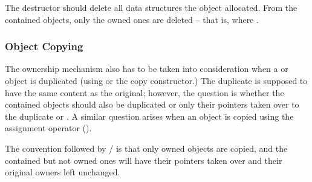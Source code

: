 The destructor should delete all data structures the object allocated.
From the contained objects, only the owned ones are deleted -- that is,
where .


\subsubsection{Object Copying}
\label{sec:sim-lib:ownership-and-object-copying}

The ownership mechanism also has to be taken into consideration
when a  or  object is duplicated
(using  or the copy constructor.)
The duplicate is supposed to have the same content as the
original; however, the question is whether the contained objects
should also be duplicated or only their pointers taken over
to the duplicate  or . A similar
question arises when an object is copied using the assignment operator
().

The convention followed by / is that
only owned objects are copied, and the contained but not owned ones
will have their pointers taken over and their original owners
left unchanged.


%
%
%
%
%
%
%


